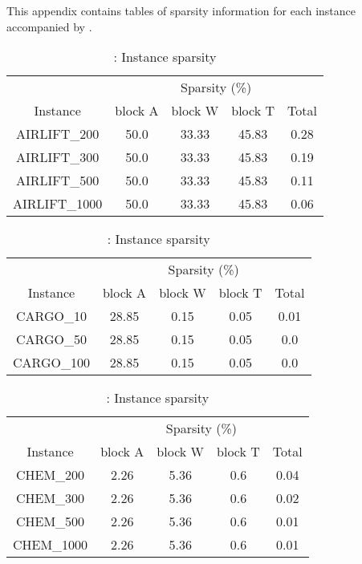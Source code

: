 This appendix contains tables of sparsity information for each instance accompanied by \siplibtwo.

\begin{table}[H]
	\centering
	\caption{\airlift: Instance sparsity} 
	\label{table:instance_sparsity_info_airlift} 
	\begin{tabular}{|c|cccc|}
		\hline 
		& \multicolumn{4}{c|}{Sparsity (\%)}  \\ \cline{2-5}
		Instance      & block A & block W & block T & Total \\ \hline
		AIRLIFT\_200 & 50.0 & 33.33 & 45.83 & 0.28 \\ 
		AIRLIFT\_300 & 50.0 & 33.33 & 45.83 & 0.19 \\ 
		AIRLIFT\_500 & 50.0 & 33.33 & 45.83 & 0.11 \\ 
		AIRLIFT\_1000 & 50.0 & 33.33 & 45.83 & 0.06 \\ 
		\hline 
	\end{tabular} 
\end{table} 

\begin{table}[H]
\centering
\caption{\cargo: Instance sparsity} 
\label{table:instance_sparsity_info_cargo} 
\begin{tabular}{|c|cccc|}
	\hline 
	& \multicolumn{4}{c|}{Sparsity (\%)}  \\ \cline{2-5}
	Instance      & block A & block W & block T & Total \\ \hline
	CARGO\_10 & 28.85 & 0.15 & 0.05 & 0.01 \\ 
	CARGO\_50 & 28.85 & 0.15 & 0.05 & 0.0 \\ 
	CARGO\_100 & 28.85 & 0.15 & 0.05 & 0.0 \\ 
	\hline 
\end{tabular} 
\end{table} 


\begin{table}[H]
\centering
\caption{\chem: Instance sparsity} 
\label{table:instance_sparsity_info_chem} 
\begin{tabular}{|c|cccc|}
\hline 
& \multicolumn{4}{c|}{Sparsity (\%)}  \\ \cline{2-5}
Instance      & block A & block W & block T & Total \\ \hline
CHEM\_200 & 2.26 & 5.36 & 0.6 & 0.04 \\ 
CHEM\_300 & 2.26 & 5.36 & 0.6 & 0.02 \\ 
CHEM\_500 & 2.26 & 5.36 & 0.6 & 0.01 \\ 
CHEM\_1000 & 2.26 & 5.36 & 0.6 & 0.01 \\ 
\hline 
\end{tabular} 
\end{table} 


